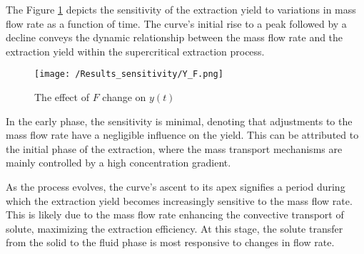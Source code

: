 \documentclass[../Article_Sensitivity_Analsysis.tex]{subfiles}
\begin{document}
    
	The Figure \ref{fig:Sensitivty_F_y} depicts the sensitivity of the extraction yield to variations in mass flow rate  as a function of time. The curve’s initial rise to a peak followed by a decline conveys the dynamic relationship between the mass flow rate and the extraction yield within the supercritical extraction process.
	
	\begin{figure}[h!]
		\centering
		\texttt{[image: /Results\_sensitivity/Y\_F.png]}
		\caption{The effect of $F$ change on $y(t)$}
		\label{fig:Sensitivty_F_y}
	\end{figure}
	
	In the early phase, the sensitivity is minimal, denoting that adjustments to the mass flow rate have a negligible influence on the yield. This can be attributed to the initial phase of the extraction, where the mass transport mechanisms are mainly controlled by a high concentration gradient.
	
	As the process evolves, the curve's ascent to its apex signifies a period during which the extraction yield becomes increasingly sensitive to the mass flow rate. This is likely due to the mass flow rate enhancing the convective transport of solute, maximizing the extraction efficiency. At this stage, the solute transfer from the solid to the fluid phase is most responsive to changes in flow rate.
	
\end{document}
